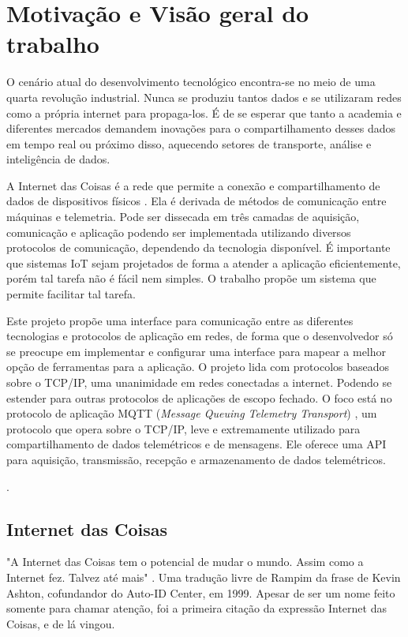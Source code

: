 \chapter{Motivação e Visão geral do trabalho}
\label{chapter:intro}

O cenário atual do desenvolvimento tecnológico encontra-se no meio de uma quarta revolução industrial. Nunca se produziu tantos dados e se utilizaram redes como a própria internet para propaga-los. É de se esperar que tanto a academia e diferentes mercados demandem inovações para o compartilhamento desses dados em tempo real ou próximo disso, aquecendo setores de transporte, análise e inteligência de dados.

A Internet das Coisas é a rede que permite a conexão e compartilhamento de dados  de dispositivos físicos . Ela é derivada de métodos de comunicação entre máquinas e telemetria. Pode ser dissecada em três camadas de aquisição, comunicação e aplicação  podendo ser implementada utilizando diversos protocolos de comunicação, dependendo da tecnologia disponível. É importante que sistemas IoT sejam projetados de forma a atender a aplicação eficientemente, porém tal tarefa não é fácil nem simples. O trabalho propõe um sistema que permite facilitar tal tarefa.

Este projeto propõe uma interface para comunicação entre as diferentes tecnologias e protocolos de aplicação em redes, de forma que o desenvolvedor só se preocupe em  implementar e configurar uma interface para mapear a melhor opção de ferramentas para a aplicação. O projeto lida com protocolos baseados sobre o TCP/IP, uma unanimidade em redes conectadas a internet. Podendo se estender para outras protocolos de aplicações de escopo fechado. O foco está no protocolo de aplicação MQTT (\textit{Message Queuing Telemetry Transport}) \cite{mqtt}, um protocolo que opera sobre o TCP/IP, leve e extremamente utilizado para compartilhamento  de dados telemétricos e de mensagens. Ele oferece uma API para aquisição, transmissão, recepção e armazenamento de dados telemétricos.

.

\section{Internet das Coisas}
\label{section:iot}

"A Internet das Coisas tem o potencial de mudar o mundo. Assim como a Internet fez. Talvez até mais" \cite{ashton:iot}. Uma tradução livre de Rampim \cite{Rampim:iot} da frase de Kevin Ashton, cofundandor do Auto-ID Center, em 1999. Apesar de ser um nome feito somente para chamar atenção, foi a primeira citação da expressão Internet das Coisas, e de lá vingou.

